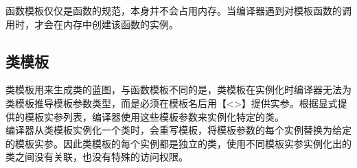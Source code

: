 函数模板仅仅是函数的规范，本身并不会占用内存。当编译器遇到对模板函数的调用时，才会在内存中创建该函数的实例。

\subsection{类模板}

类模板用来生成类的蓝图，与函数模板不同的是，类模板在实例化时编译器无法为类模板推导模板参数类型，而是必须在模板名后用【<>】提供实参。根据显式提供的模板实参列表，编译器使用这些模板参数来实例化特定的类。 \\

编译器从类模板实例化一个类时，会重写模板，将模板参数的每个实例替换为给定的模板实参。因此类模板的每个实例都是独立的类，使用不同模板实参实例化出的类之间没有关联，也没有特殊的访问权限。 \\


